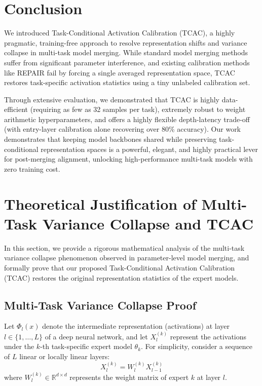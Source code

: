 \documentclass{article}
\theoremstyle{plain}
\theoremstyle{definition}
\theoremstyle{remark}
\begin{document}
\section{Conclusion}
\label{sec:conclusion}
We introduced Task-Conditional Activation Calibration (TCAC), a highly pragmatic, training-free approach to resolve representation shifts and variance collapse in multi-task model merging. While standard model merging methods suffer from significant parameter interference, and existing calibration methods like REPAIR fail by forcing a single averaged representation space, TCAC restores task-specific activation statistics using a tiny unlabeled calibration set. 

Through extensive evaluation, we demonstrated that TCAC is highly data-efficient (requiring as few as 32 samples per task), extremely robust to weight arithmetic hyperparameters, and offers a highly flexible depth-latency trade-off (with entry-layer calibration alone recovering over 80\% accuracy). Our work demonstrates that keeping model backbones shared while preserving task-conditional representation spaces is a powerful, elegant, and highly practical lever for post-merging alignment, unlocking high-performance multi-task models with zero training cost.




\newpage
\appendix
\onecolumn
\section{Theoretical Justification of Multi-Task Variance Collapse and TCAC}
\label{sec:appendix_proof}

In this section, we provide a rigorous mathematical analysis of the multi-task variance collapse phenomenon observed in parameter-level model merging, and formally prove that our proposed Task-Conditional Activation Calibration (TCAC) restores the original representation statistics of the expert models.

\subsection{Multi-Task Variance Collapse Proof}
Let $\Phi_l(x)$ denote the intermediate representation (activations) at layer $l \in \{1, \dots, L\}$ of a deep neural network, and let $X_l^{(k)}$ represent the activations under the $k$-th task-specific expert model $\theta_k$. For simplicity, consider a sequence of $L$ linear or locally linear layers:
\begin{equation}
X_l^{(k)} = W_l^{(k)} X_{l-1}^{(k)}
\end{equation}
where $W_l^{(k)} \in \mathbb{R}^{d \times d}$ represents the weight matrix of expert $k$ at layer $l$. 
\end{document}
